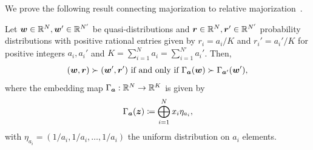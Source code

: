 \documentclass[pra,
aps,
twocolumn,
superscriptaddress,
groupedaddress,
nofootinbib,
reprint
]{revtex4-1}
\begin{document}
We prove the following result connecting majorization to relative majorization~\cite{cit:horodecki2013, Brandao_2015,  cit:lostaglio}.
\begin{proposition}\label{relmaj2maj}
	Let $\boldsymbol{w}\in \mathbb{R}^N, \boldsymbol{w}'\in \mathbb{R}^{N'}$ be quasi-distributions and $\boldsymbol{r}\in \mathbb{R}^N, \boldsymbol{r}'\in \mathbb{R}^{N'}$ probability distributions with positive rational entries given by $r_i = a_i/K$ and $r_i' = a_i'/K$ for positive integers $a_i, a_i'$ and $K = \sum_{i=1}^N a_i = \sum_{i=1}^{N'} a_i'$. 
Then,
\begin{equation}
(\boldsymbol{w}, \boldsymbol{r}) \succ (\boldsymbol{w}', \boldsymbol{r}') \mbox{ if and only if } \Gamma_{\bm{a}} (\boldsymbol{w}) \succ \Gamma_{\bm{a}'} (\boldsymbol{w}'),
\end{equation}
where the embedding map $\Gamma_{\bm{a}} :\mathbb{R}^N \rightarrow \mathbb{R}^K$ is given by
\begin{equation}
	\Gamma_{\bm{a}}(\bm{z}) \coloneqq \bigoplus_{i=1}^N x_i \eta_{a_i},
\end{equation}
with $\eta_{a_i} = (1/a_i, 1/a_i, \dots, 1/a_i)$ the uniform distribution on $a_i$ elements.
\end{proposition}
\end{document}
